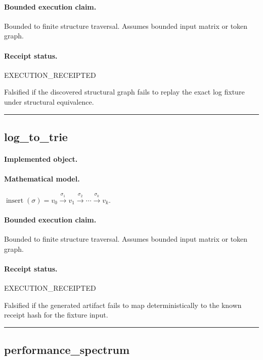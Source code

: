 \paragraph{Bounded execution claim.} Bounded to finite structure traversal. Assumes bounded input matrix or token graph.
\paragraph{Receipt status.} EXECUTION\_RECEIPTED
\begin{falsifier}
Falsified if the discovered structural graph fails to replay the exact log fixture under structural equivalence.
\end{falsifier}

\vspace{1em}\hrule\vspace{1em}
\subsection{log\_to\_trie}
\paragraph{Implemented object.} 
\paragraph{Mathematical model.} $\operatorname{insert}(\sigma) = v_0\xrightarrow{\sigma_1}v_1 \xrightarrow{\sigma_2}\cdots \xrightarrow{\sigma_k}v_k.$
\paragraph{Bounded execution claim.} Bounded to finite structure traversal. Assumes bounded input matrix or token graph.
\paragraph{Receipt status.} EXECUTION\_RECEIPTED
\begin{falsifier}
Falsified if the generated artifact fails to map deterministically to the known receipt hash for the fixture input.
\end{falsifier}

\vspace{1em}\hrule\vspace{1em}
\subsection{performance\_spectrum}
